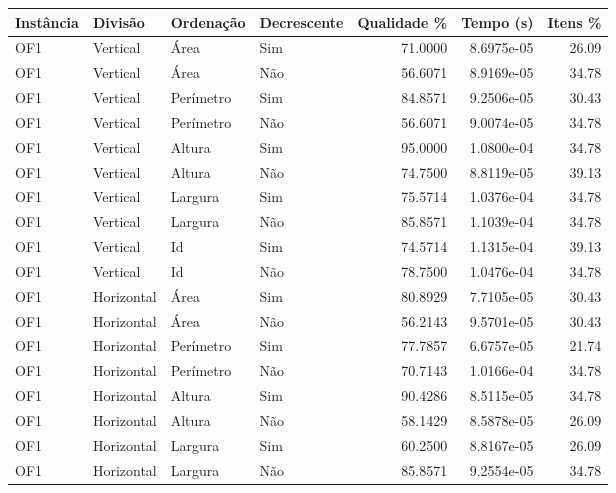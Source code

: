 \begin{tabular}{llllrrr}
    \hline
    Instância & Divisão     & Ordenação & Decrescente & Qualidade \% & Tempo (s)  & Itens \% \\
    \hline
    OF1       & Vertical    & Área      & Sim         & 71.0000      & 8.6975e-05 & 26.09    \\
    OF1       & Vertical    & Área      & Não         & 56.6071      & 8.9169e-05 & 34.78    \\
    OF1       & Vertical    & Perímetro & Sim         & 84.8571      & 9.2506e-05 & 30.43    \\
    OF1       & Vertical    & Perímetro & Não         & 56.6071      & 9.0074e-05 & 34.78    \\
    OF1       & Vertical    & Altura    & Sim         & 95.0000      & 1.0800e-04 & 34.78    \\
    OF1       & Vertical    & Altura    & Não         & 74.7500      & 8.8119e-05 & 39.13    \\
    OF1       & Vertical    & Largura   & Sim         & 75.5714      & 1.0376e-04 & 34.78    \\
    OF1       & Vertical    & Largura   & Não         & 85.8571      & 1.1039e-04 & 34.78    \\
    OF1       & Vertical    & Id        & Sim         & 74.5714      & 1.1315e-04 & 39.13    \\
    OF1       & Vertical    & Id        & Não         & 78.7500      & 1.0476e-04 & 34.78    \\
    OF1       & Horizontal  & Área      & Sim         & 80.8929      & 7.7105e-05 & 30.43    \\
    OF1       & Horizontal  & Área      & Não         & 56.2143      & 9.5701e-05 & 30.43    \\
    OF1       & Horizontal  & Perímetro & Sim         & 77.7857      & 6.6757e-05 & 21.74    \\
    OF1       & Horizontal  & Perímetro & Não         & 70.7143      & 1.0166e-04 & 34.78    \\
    OF1       & Horizontal  & Altura    & Sim         & 90.4286      & 8.5115e-05 & 34.78    \\
    OF1       & Horizontal  & Altura    & Não         & 58.1429      & 8.5878e-05 & 26.09    \\
    OF1       & Horizontal  & Largura   & Sim         & 60.2500      & 8.8167e-05 & 26.09    \\
    OF1       & Horizontal  & Largura   & Não         & 85.8571      & 9.2554e-05 & 34.78    \\

\end{tabular}
